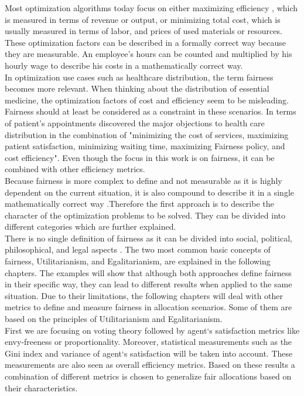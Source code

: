 \documentclass[german, a4paper, 11pt, oneside]{scrbook}
\begin{document}
Most optimization algorithms today focus on either maximizing efficiency \cite{Foulds.7222018}, which is measured in terms of revenue or output, or minimizing total cost, which is usually measured in terms of labor, and prices of used materials or resources. \cite{XinyingChen.2023, .} These optimization factors can be described in a formally correct way because they are measurable. An employee's hours can be counted and multiplied by his hourly wage to describe his costs in a mathematically correct way. \\In optimization use cases such as healthcare distribution, the term fairness becomes more relevant. When thinking about the distribution of essential medicine, the optimization factors of cost and efficiency seem to be misleading. Fairness should at least be considered as a constraint in these scenarios. In terms of patient's appointments \cite{Ala.2021} discovered the major objections to health care distribution in the combination of "minimizing the cost of services, maximizing patient satisfaction, minimizing waiting time, maximizing Fairness policy, and cost efficiency". \cite{Ala.2021} Even though the focus in this work is on fairness, it can be combined with other efficiency metrics.\\ Because fairness is more complex to define and not measurable as it is highly dependent on the current situation, it is also compound to describe it in a single mathematically correct way \cite{Binns.}.Therefore the first approach is to describe the character of the optimization problems to be solved. They can be divided into different categories which are further explained. \\ There is no single definition of fairness as it can be divided into social, political, philosophical, and legal aspects \cite{Foulds.7222018}. The two most common basic concepts of fairness, Utilitarianism, and Egalitarianism, are explained in the following chapters. The examples will show that although both approaches define fairness in their specific way, they can lead to different results when applied to the same situation. \cite{Yu.7222022} Due to their limitations, the following chapters will deal with other metrics to define and measure fairness in allocation scenarios. Some of them are based on the principles of Utilitarianism and Egalitarianism. \\ First we are focusing on voting theory followed by agent`s satisfaction metrics like envy-freeness or proportionality. Moreover, statistical measurements such as the Gini index and variance of agent`s satisfaction will be taken into account. These measurements are also seen as overall efficiency metrics. Based on these results a combination of different metrics is chosen to generalize fair allocations based on their characteristics.
\end{document}
